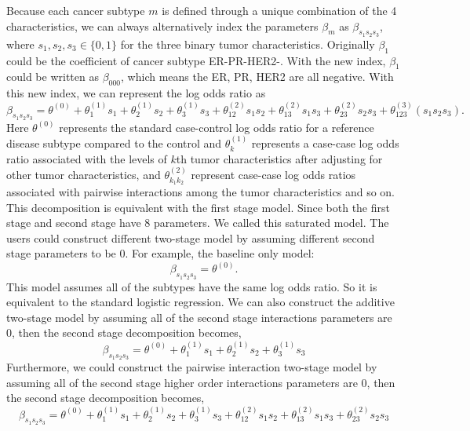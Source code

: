 \documentclass[11pt,]{article}
\begin{document}
Because each cancer subtype \(m\) is defined through a unique
combination of the 4 characteristics, we can always alternatively index
the parameters \(\beta_m\) as \(\beta_{s_1s_2s_3}\), where
\(s_1,s_2,s_3\in\{0,1\}\) for the three binary tumor characteristics.
Originally \(\beta_1\) could be the coefficient of cancer subtype
ER-PR-HER2-. With the new index, \(\beta_1\) could be written as
\(\beta_{000}\), which means the ER, PR, HER2 are all negative. With
this new index, we can represent the log odds ratio as
\[\beta_{s_{1}s_{2}s_{3}}=\theta^{(0)}+\theta_{1}^{(1)}s_{1}+\theta_{2}^{(1)}s_{2}+\theta_{3}^{(1)}s_{3}+\theta_{12}^{(2)}s_{1}s_{2}+\theta_{13}^{(2)}s_{1}s_{3}+\theta_{23}^{(2)}s_{2}s_{3}
+\theta_{123}^{(3)}(s_{1}s_{2}s_{3}).\] Here \(\theta^{(0)}\) represents
the standard case-control log odds ratio for a reference disease subtype
compared to the control and \(\theta_{k}^{(1)}\) represents a case-case
log odds ratio associated with the levels of \(k\)th tumor
characteristics after adjusting for other tumor characteristics, and
\(\theta_{k_1k_2}^{(2)}\) represent case-case log odds ratios associated
with pairwise interactions among the tumor characteristics and so on.
This decomposition is equivalent with the first stage model. Since both
the first stage and second stage have 8 parameters. We called this
saturated model. The users could construct different two-stage model by
assuming different second stage parameters to be 0. For example, the
baseline only model: \[\beta_{s_{1}s_{2}s_{3}}=\theta^{(0)}.\] This
model assumes all of the subtypes have the same log odds ratio. So it is
equivalent to the standard logistic regression. We can also construct
the additive two-stage model by assuming all of the second stage
interactions parameters are 0, then the second stage decomposition
becomes,
\[\beta_{s_{1}s_{2}s_{3}}=\theta^{(0)}+\theta_{1}^{(1)}s_{1}+\theta_{2}^{(1)}s_{2}+\theta_{3}^{(1)}s_{3}\]
Furthermore, we could construct the pairwise interaction two-stage model
by assuming all of the second stage higher order interactions parameters
are 0, then the second stage decomposition becomes,
\[\beta_{s_{1}s_{2}s_{3}}=\theta^{(0)}+\theta_{1}^{(1)}s_{1}+\theta_{2}^{(1)}s_{2}+\theta_{3}^{(1)}s_{3}+\theta_{12}^{(2)}s_{1}s_{2}+\theta_{13}^{(2)}s_{1}s_{3}+\theta_{23}^{(2)}s_{2}s_{3}\]
\end{document}
